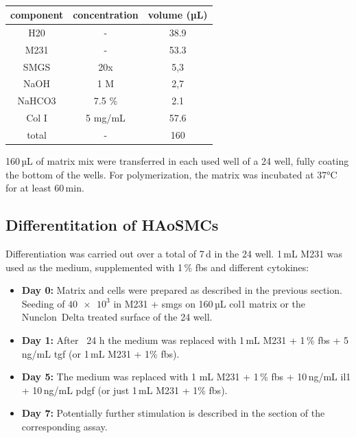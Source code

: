     \begin{table}[h]
    \capstart
	\centering
	\begin{minipage}{\captionwidth}
	   	\caption[Col I matrix]{}
	   	\label{tab:qPCR_samples}
	\end{minipage}
    \begin{tabular}{|c|c|c|}
        \hline
        component & concentration & volume (µL) \\ \hline
        H20       & -             & 38.9        \\
        M231      & -             & 53.3        \\
        SMGS      & 20x           & 5,3         \\
        NaOH      & 1 M           & 2,7         \\
        NaHCO3    & 7.5 \%        & 2.1         \\
        Col I     & 5 mg/mL       & 57.6        \\ \hline
        total     & -             & 160         \\ \hline
    \end{tabular}
    \end{table}

    160\,µL of matrix mix were transferred in each used well of a \ac{24 well}, fully coating the bottom of the wells. For polymerization, the matrix was incubated at 37°C for at least 60\,min.

    \subsection{Differentitation of HAoSMCs}
    \label{subsec:differentiation}
    Differentiation was carried out over a total of 7\,d in the \ac{24 well}. 1\,mL M231 was used as the medium, supplemented with 1\,\% \ac{fbs} and different cytokines:
    \begin{itemize}
        \item \textbf{Day 0:} Matrix and cells were prepared as described in the previous section. Seeding of $\num{40e3}$ in \ac{M231} + \ac{smgs} on 160\,µL \ac{col1} matrix or the Nunclon\texttrademark~Delta treated surface of the \ac{24 well}.
        \item \textbf{Day 1:} After ~24 h the medium was replaced with 1\,mL M231 + 1\,\% \ac{fbs} + 5\,ng/mL \ac{tgf} (or 1\,mL \ac{M231} + 1\% \ac{fbs}).
        \item \textbf{Day 5:} The medium was replaced with 1 mL M231 + 1\,\% \ac{fbs} + 10\,ng/mL \ac{il1} + 10\,ng/mL \ac{pdgf} (or just 1\,mL \ac{M231} + 1\% \ac{fbs}).
        \item \textbf{Day 7:} Potentially further stimulation is described in the section of the corresponding assay.
    \end{itemize}

